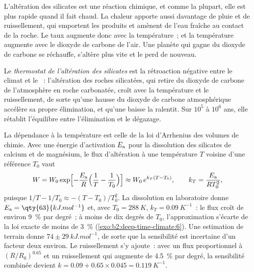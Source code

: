 L'altération des silicates est une réaction chimique, et comme la plupart, elle est plus rapide quand il fait chaud. La chaleur
apporte aussi davantage de pluie et de ruissellement, qui emportent les produits et amènent de l'eau fraîche au
contact de la roche. Le taux augmente donc avec la température~; et la température augmente avec le dioxyde de carbone de
l'air. Une planète qui gagne du dioxyde de carbone se réchauffe, s'altère plus vite et le perd de nouveau.

\begin{definition}\label{def:b2:deep-time-climate:thermostat}
Le \emph{thermostat de l'altération des silicates} est la rétroaction négative
entre le climat et le ~: l'altération des roches silicatées, qui retire du dioxyde de carbone
de l'atmosphère en roche carbonatée, croît avec la température et le ruissellement, de sorte qu'une hausse du dioxyde de
carbone atmosphérique accélère sa propre élimination, et qu'une baisse la ralentit. Sur $10^5$ à $10^6$ ans, elle rétablit
l'équilibre entre l'élimination et le
dégazage.
\end{definition}

La dépendance à la température est celle de la loi d'Arrhenius des volumes de chimie. Avec une énergie d'activation
$E_{\text a}$ pour la dissolution des silicates de calcium et de magnésium, le flux d'altération à une température
$T$ voisine d'une référence $T_0$ vaut
\[
  W = W_0 \exp\Bigl[-\frac{E_{\text a}}{R}\Bigl(\frac1T - \frac1{T_0}\Bigr)\Bigr]
  \approx W_0\, e^{k_T (T - T_0)}, \qquad k_T = \frac{E_{\text a}}{R T_0^2},
\]
puisque $1/T - 1/T_0 \approx -(T - T_0)/T_0^2$. La dissolution en laboratoire donne $E_{\text a} =
\qty{63}{kJ.mol^{-1}}$ et, avec $T_0 = \qty{288}{K}$, $k_T = \qty{0.09}{K^{-1}}$~: le flux croît de
environ \qty{9}{\percent} par degré~; à moins de dix degrés de $T_0$, l'approximation s'écarte de la loi exacte de
moins de \qty{3}{\percent} (\cref{exo:b2:deep-time-climate:6}). Une estimation de terrain donne
$74 \pm \qty{29}{kJ.mol^{-1}}$, de sorte que la sensibilité est incertaine d'un facteur deux environ. Le ruissellement
s'y ajoute~: avec un flux proportionnel à $(R/R_0)^{0.65}$ et un ruissellement qui augmente de
\qty{4.5}{\percent} par degré, la sensibilité combinée devient $k = 0.09 + 0.65\times0.045 =
\qty{0.119}{K^{-1}}$.


